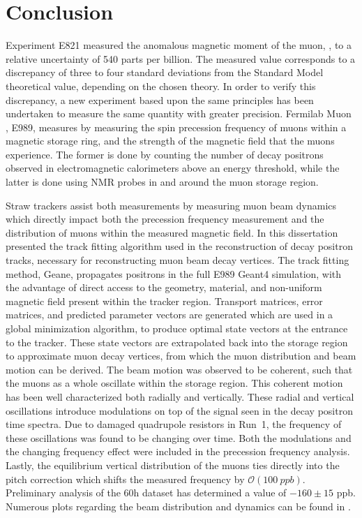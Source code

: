 
\thispagestyle{myheadings} %

\chapter{Conclusion}
\label{chapter:Conclusion}


Experiment E821 measured the anomalous magnetic moment of the muon, \amu, to a relative uncertainty of 540 parts per billion. The measured value corresponds to a discrepancy of three to four standard deviations from the Standard Model theoretical value, depending on the chosen theory. In order to verify this discrepancy, a new experiment based upon the same principles has been undertaken to measure the same quantity with greater precision. Fermilab Muon \gmtwo, E989, measures \amu by measuring the spin precession frequency of muons within a magnetic storage ring, and the strength of the magnetic field that the muons experience. The former is done by counting the number of decay positrons observed in electromagnetic calorimeters above an energy threshold, while the latter is done using NMR probes in and around the muon storage region. 


Straw trackers assist both measurements by measuring muon beam dynamics which directly impact both the precession frequency measurement and the distribution of muons within the measured magnetic field. In  this dissertation presented the track fitting algorithm used in the reconstruction of decay positron tracks, necessary for reconstructing muon beam decay vertices. The track fitting method, Geane, propagates positrons in the full E989 Geant4 simulation, with the advantage of direct access to the geometry, material, and non-uniform magnetic field present within the tracker region. Transport matrices, error matrices, and predicted parameter vectors are generated which are used in a global \chisq minimization algorithm, to produce optimal state vectors at the entrance to the tracker. These state vectors are extrapolated back into the storage region to approximate muon decay vertices, from which the muon distribution and beam motion can be derived. The beam motion was observed to be coherent, such that the muons as a whole oscillate within the storage region. This coherent motion has been well characterized both radially and vertically. These radial and vertical oscillations introduce modulations on top of the \wa signal seen in the decay positron time spectra. Due to damaged quadrupole resistors in Run~1, the frequency of these oscillations was found to be changing over time. Both the modulations and the changing frequency effect were included in the precession frequency analysis. Lastly, the equilibrium vertical distribution of the muons ties directly into the pitch correction which shifts the measured \wa frequency by $\mathcal{O}(\SI{100}{ppb})$. Preliminary analysis of the 60h dataset has determined a value of $-160 \pm 15$\xspace ppb. Numerous plots regarding the beam distribution and dynamics can be found in . 


